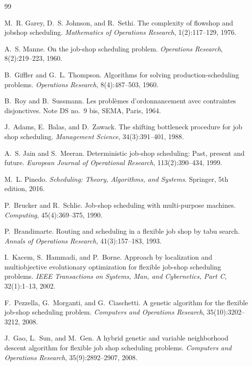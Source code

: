 \begin{thebibliography}{99}

M.~R. Garey, D.~S. Johnson, and R.~Sethi.
The complexity of flowshop and jobshop scheduling.
\emph{Mathematics of Operations Research}, 1(2):117--129, 1976.

A.~S. Manne.
On the job-shop scheduling problem.
\emph{Operations Research}, 8(2):219--223, 1960.

B.~Giffler and G.~L. Thompson.
Algorithms for solving production-scheduling problems.
\emph{Operations Research}, 8(4):487--503, 1960.

B.~Roy and B.~Sussmann.
Les probl\`emes d'ordonnancement avec contraintes disjonctives.
Note DS no.~9 bis, SEMA, Paris, 1964.

J.~Adams, E.~Balas, and D.~Zawack.
The shifting bottleneck procedure for job shop scheduling.
\emph{Management Science}, 34(3):391--401, 1988.

A.~S. Jain and S.~Meeran.
Deterministic job-shop scheduling: Past, present and future.
\emph{European Journal of Operational Research}, 113(2):390--434, 1999.

M.~L. Pinedo.
\emph{Scheduling: Theory, Algorithms, and Systems}.
Springer, 5th edition, 2016.

P.~Brucker and R.~Schlie.
Job-shop scheduling with multi-purpose machines.
\emph{Computing}, 45(4):369--375, 1990.

P.~Brandimarte.
Routing and scheduling in a flexible job shop by tabu search.
\emph{Annals of Operations Research}, 41(3):157--183, 1993.

I.~Kacem, S.~Hammadi, and P.~Borne.
Approach by localization and multiobjective evolutionary optimization for flexible job-shop scheduling problems.
\emph{IEEE Transactions on Systems, Man, and Cybernetics, Part C}, 32(1):1--13, 2002.

F.~Pezzella, G.~Morganti, and G.~Ciaschetti.
A genetic algorithm for the flexible job-shop scheduling problem.
\emph{Computers and Operations Research}, 35(10):3202--3212, 2008.

J.~Gao, L.~Sun, and M.~Gen.
A hybrid genetic and variable neighborhood descent algorithm for flexible job shop scheduling problems.
\emph{Computers and Operations Research}, 35(9):2892--2907, 2008.


\end{thebibliography}
